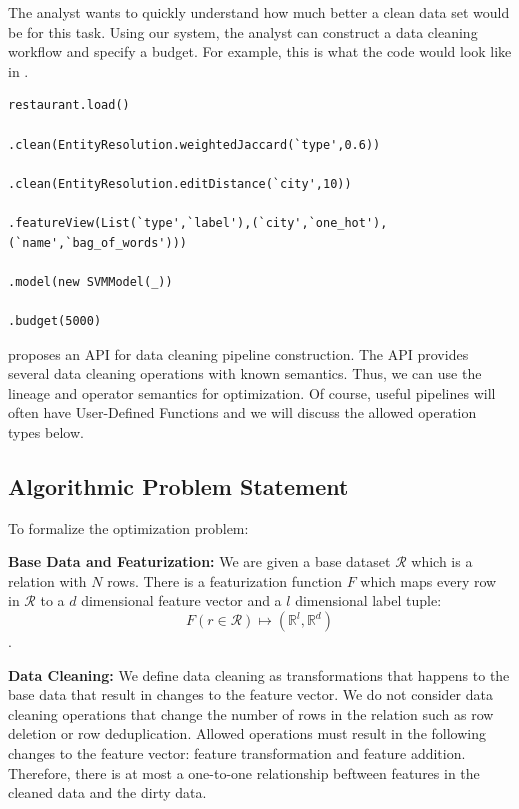 
The analyst wants to quickly understand how much better a clean data set would be for this task.
Using our system, the analyst can construct a data cleaning workflow and specify a budget.
For example, this is what the code would look like in \sys.
\begin{lstlisting}[mathescape,basicstyle={\scriptsize}]
restaurant.load()

.clean(EntityResolution.weightedJaccard(`type',0.6))

.clean(EntityResolution.editDistance(`city',10))

.featureView(List(`type',`label'),(`city',`one_hot'),(`name',`bag_of_words')))

.model(new SVMModel(_))

.budget(5000)
\end{lstlisting}

\sys proposes an API for data cleaning pipeline construction. 
The API provides several data cleaning operations with known semantics.
Thus, we can use the lineage and operator semantics for optimization.
Of course, useful pipelines will often have User-Defined Functions and 
we will discuss the allowed operation types below.



\subsection{Algorithmic Problem Statement}
To formalize the optimization problem:

\noindent\textbf{Base Data and Featurization: } We are given a base dataset $\mathcal{R}$ which is a relation with $N$ rows. There is a featurization function $F$ which maps every row in $\mathcal{R}$ to a $d$ dimensional feature vector and a $l$ dimensional label tuple: \[F(r \in \mathcal{R}) \mapsto (\mathbb{R}^l, \mathbb{R}^d)\]. 

\noindent\textbf{Data Cleaning: } We define data cleaning as transformations that happens to the base data that result in changes to the feature vector. We do not consider data cleaning operations that change the number of rows in the relation such as row deletion or row deduplication. Allowed operations must result in the following changes to the feature vector: feature transformation and feature addition. Therefore, there is at most a one-to-one relationship beftween features in the cleaned data and the dirty data.


